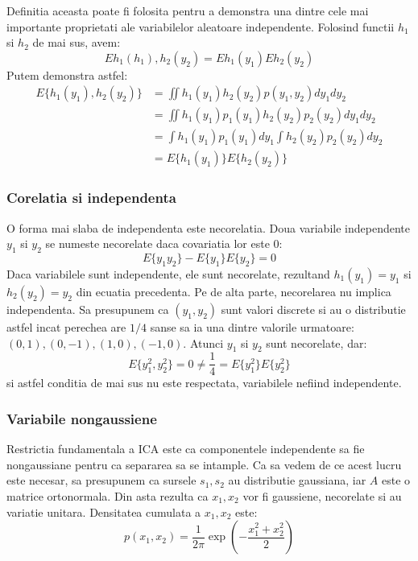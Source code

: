 \documentclass[12pt]{article}
\begin{document}
Definitia aceasta poate fi folosita pentru a demonstra una dintre cele mai importante proprietati ale variabilelor aleatoare independente. Folosind functii $h_1$ si $h_2$ de mai sus, avem:
\begin{equation}
E{h_1(h_1),h_2(y_2)}=E{h_1(y_1)}E{h_2(y_2)}
\end{equation}
Putem demonstra astfel:
\begin{equation}
\begin{split}
E\{h_1(y_1),h_2(y_2)\} & =\iint{h_1(y_1)h_2(y_2)p(y_1,y_2)dy_1dy_2} \\ 
& =\iint{h_1(y_1)p_1(y_1)h_2(y_2)p_2(y_2)dy_1dy_2} \\
& =\int{h_1(y_1)p_1(y_1)dy_1}\int{h_2(y_2)p_2(y_2)dy_2}\\ 
& =E\{h_1(y_1)\}E\{h_2(y_2)\}
\end{split}
\end{equation}

\subsubsection{Corelatia si independenta}
O forma mai slaba de independenta este necorelatia. Doua variabile independente $y_1$ si $y_2$ se numeste necorelate daca covariatia lor este 0:
\begin{equation}
	E\{y_1y_2\}-E\{y_1\}E\{y_2\}=0
\end{equation}
Daca variabilele sunt independente, ele sunt necorelate, rezultand $h_1(y_1)=y_1$ si $h_2(y_2)=y_2$ din ecuatia precedenta.
Pe de alta parte, necorelarea nu implica independenta. Sa presupunem ca $(y_1,y_2)$ sunt valori discrete si au o distributie astfel incat perechea are $1/4$ sanse sa ia una dintre valorile urmatoare: $(0,1),(0,-1),(1,0),(-1,0)$. Atunci $y_1$ si $y_2$ sunt necorelate, dar:
\begin{equation}
E\{y_1^2, y_2^2\}=0 \neq \frac{1}{4} = E\{y_1^2\}E\{y_2^2\}
\end{equation}
si astfel conditia de mai sus nu este respectata, variabilele nefiind independente.
\subsubsection{Variabile nongaussiene}
Restrictia fundamentala a ICA este ca componentele independente sa fie nongaussiane pentru ca separarea sa se intample. Ca sa vedem de ce acest lucru este necesar, sa presupunem ca sursele $s_1, s_2$ au distributie gaussiana, iar $A$ este o matrice ortonormala. Din asta rezulta ca $x_1,x_2$ vor fi gaussiene, necorelate si au variatie unitara. Densitatea cumulata a $x_1, x_2$ este:
\begin{equation}
	p(x_1,x_2)=\frac{1}{2\pi}\exp(-\frac{x_1^2+x_2^2}{2})
\end{equation}
\end{document}
